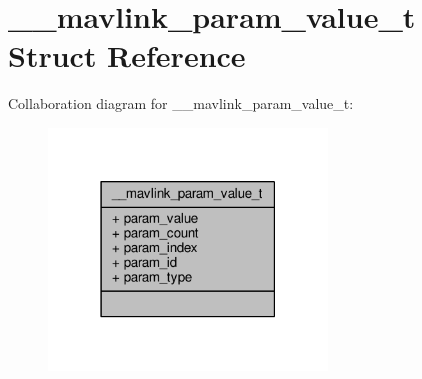 \hypertarget{struct____mavlink__param__value__t}{\section{\+\_\+\+\_\+mavlink\+\_\+param\+\_\+value\+\_\+t Struct Reference}
\label{struct____mavlink__param__value__t}
}


Collaboration diagram for \+\_\+\+\_\+mavlink\+\_\+param\+\_\+value\+\_\+t\+:
\nopagebreak
\begin{figure}[H]
\begin{center}
\leavevmode
\includegraphics[width=210pt]{struct____mavlink__param__value__t__coll__graph}
\end{center}
\end{figure}
